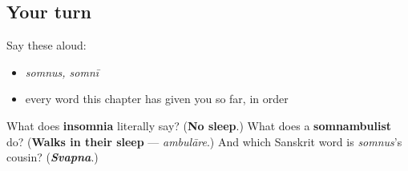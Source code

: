 \subsection*{Your turn}
Say these aloud:

\begin{itemize}
\raggedright
  \item \emph{somnus, somnī}
  \item every word this chapter has given you so far, in order
\end{itemize}

\begin{tcolorbox}[breakable,colback=teal!4,colframe=teal!35!black,title={Before you move on}]
What does \textbf{insomnia} literally say? (\textbf{No sleep}.) What does a \textbf{somnambulist} do? (\textbf{Walks in their sleep} — \emph{ambulāre}.) And which Sanskrit word is \emph{somnus}'s cousin? (\emph{\textbf{Svapna}}.)
\end{tcolorbox}
